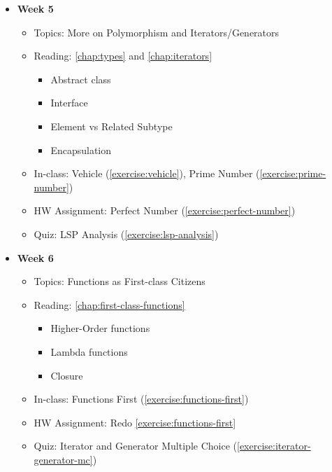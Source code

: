 \documentclass[oneside,11pt,dvipsnames]{book}
\begin{document}
\begin{itemize}
    \item \textbf{Week 5}
    \begin{itemize}
        \item Topics: More on Polymorphism and Iterators/Generators
        \item Reading: \autoref{chap:types} and \autoref{chap:iterators}
        \begin{itemize}
            \item Abstract class
            \item Interface
            \item Element vs Related Subtype
            \item Encapsulation
        \end{itemize}
        \item In-class: Vehicle (\autoref{exercise:vehicle}), Prime Number (\autoref{exercise:prime-number})
        \item HW Assignment: Perfect Number (\autoref{exercise:perfect-number})
        \item Quiz: LSP Analysis (\autoref{exercise:lsp-analysis})
    \end{itemize}

    \item \textbf{Week 6}
    \begin{itemize}
        \item Topics: Functions as First-class Citizens
        \item Reading: \autoref{chap:first-class-functions}
        \begin{itemize}
            \item Higher-Order functions
            \item Lambda functions
            \item Closure
        \end{itemize}
        \item In-class: Functions First (\autoref{exercise:functions-first})
        \item HW Assignment: Redo \autoref{exercise:functions-first} 
        \item Quiz: Iterator and Generator Multiple Choice (\autoref{exercise:iterator-generator-mc})
    \end{itemize}
    

\end{itemize}
\end{document}
